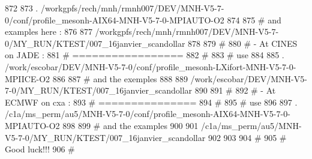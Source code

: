  872 
 873 . /workgpfs/rech/mnh/rmnh007/DEV/MNH-V5-7-0/conf/profile_mesonh-AIX64-MNH-V5-7-0-MPIAUTO-O2
 874 
 875 # and examples here :
 876 
 877 /workgpfs/rech/mnh/rmnh007/DEV/MNH-V5-7-0/MY_RUN/KTEST/007_16janvier_scandollar
 878 
 879 # 
 880 #  - At CINES on JADE :
 881 #    =================
 882 #
 883 # use 
 884 
 885 . /work/escobar/DEV/MNH-V5-7-0/conf/profile_mesonh-LXifort-MNH-V5-7-0-MPIICE-O2
 886 
 887 # and the exemples
 888 
 889 /work/escobar/DEV/MNH-V5-7-0/MY_RUN/KTEST/007_16janvier_scandollar
 890 
 891 #
 892 #  - At ECMWF on cxa :
 893 #    ===============
 894 #
 895 # use
 896 
 897 . /c1a/ms_perm/au5/MNH-V5-7-0/conf/profile_mesonh-AIX64-MNH-V5-7-0-MPIAUTO-O2
 898 
 899 # and the examples
 900 
 901 /c1a/ms_perm/au5/MNH-V5-7-0/MY_RUN/KTEST/007_16janvier_scandollar
 902 
 903 
 904 #
 905 #  Good luck!!!
 906 #